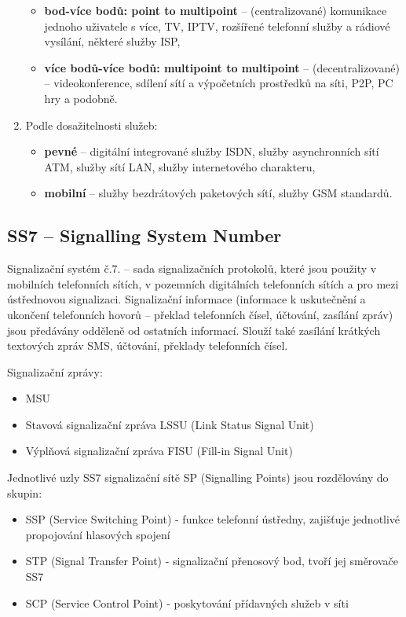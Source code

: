 \begin{enumerate}
\begin{itemize}
        \item \textbf{bod-více bodů: point to multipoint} – (centralizované) komunikace jednoho uživatele s více, TV, IPTV, rozšířené telefonní služby a rádiové vysílání, některé služby ISP,
        \item \textbf{více bodů-více bodů: multipoint to multipoint} – (decentralizované) – videokonference, sdílení sítí a výpočetních prostředků na síti, P2P, PC hry a podobně.
    \end{itemize}
    \item Podle dosažitelnosti služeb:
    \begin{itemize}
        \item \textbf{pevné} – digitální integrované služby ISDN, služby asynchronních sítí ATM, služby sítí LAN, služby internetového charakteru,
        \item \textbf{mobilní} – služby bezdrátových paketových sítí, služby GSM standardů.
    \end{itemize}
\end{enumerate}

\subsection{SS7 – Signalling System Number}
Signalizační systém č.7. -- sada signalizačních protokolů, které jsou použity v mobilních telefonních sítích, v pozemních digitálních telefonních
sítích a pro mezi ústřednovou signalizaci. Signalizační informace (informace k uskutečnění a ukončení telefonních hovorů -- překlad telefonních čísel, účtování, zasílání zpráv) jsou předávány odděleně od ostatních informací. Slouží také zasílání krátkých textových zpráv SMS, účtování, překlady telefonních čísel. 

Signalizační zprávy:
\begin{itemize}
    \item MSU
    \item Stavová signalizační zpráva LSSU (Link Status Signal Unit)
    \item Výplňová signalizační zpráva FISU (Fill-in Signal Unit)
\end{itemize}

Jednotlivé uzly SS7 signalizační sítě SP (Signalling Points) jsou rozdělovány do skupin:
\begin{itemize}
    \item SSP (Service Switching Point) - funkce telefonní ústředny, zajišťuje jednotlivé propojování hlasových spojení
    \item STP (Signal Transfer Point) - signalizační přenosový bod, tvoří jej směrovače SS7
    \item SCP (Service Control Point) - poskytování přídavných služeb v síti
\end{itemize}

